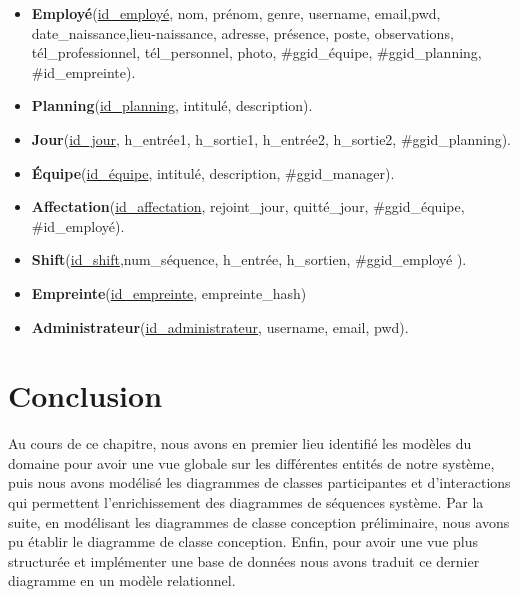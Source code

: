 \begin{itemize}
    \item [\textbullet]\textbf{Employé}(\underline{id\_employé}, nom, prénom, genre, 
        username, email,pwd, date\_naissance,lieu-naissance, adresse, présence, poste, 
        observations, tél\_professionnel, tél\_personnel, photo, \#ggid\_équipe, 
        \#ggid\_planning, \#id\_empreinte).

	\item [\textbullet]\textbf{Planning}(\underline{id\_planning}, intitulé, 
        description).
    
    \item [\textbullet]\textbf{Jour}(\underline{id\_jour}, h\_entrée1, h\_sortie1, 
        h\_entrée2, h\_sortie2, \#ggid\_planning).
    
    \item [\textbullet]\textbf{Équipe}(\underline{id\_équipe}, intitulé, 
        description, \#ggid\_manager).
    
    \item [\textbullet]\textbf{Affectation}(\underline{id\_affectation}, 
        rejoint\_jour, quitté\_jour, \#ggid\_équipe, \#id\_employé).
    
    \item [\textbullet]\textbf{Shift}(\underline{id\_shift},num\_séquence, 
        h\_entrée, h\_sortien, \#ggid\_employé ).
    
    \item [\textbullet]\textbf{Empreinte}(\underline{id\_empreinte}, 
        empreinte\_hash)
    
    \item [\textbullet]\textbf{Administrateur}(\underline{id\_administrateur}, 
        username, email, pwd).
\end{itemize}

\section{Conclusion}
Au cours de ce chapitre, nous avons en premier lieu identifié les modèles du
domaine pour avoir une vue globale sur les différentes entités de notre système,
puis nous avons modélisé les diagrammes de classes participantes et
d’interactions qui permettent l’enrichissement des diagrammes de séquences
système. Par la suite, en modélisant les diagrammes de classe conception
préliminaire, nous avons pu établir le diagramme de classe conception.  Enfin,
pour avoir une vue plus structurée et implémenter une base de données nous avons
traduit ce dernier diagramme en un modèle relationnel. 
